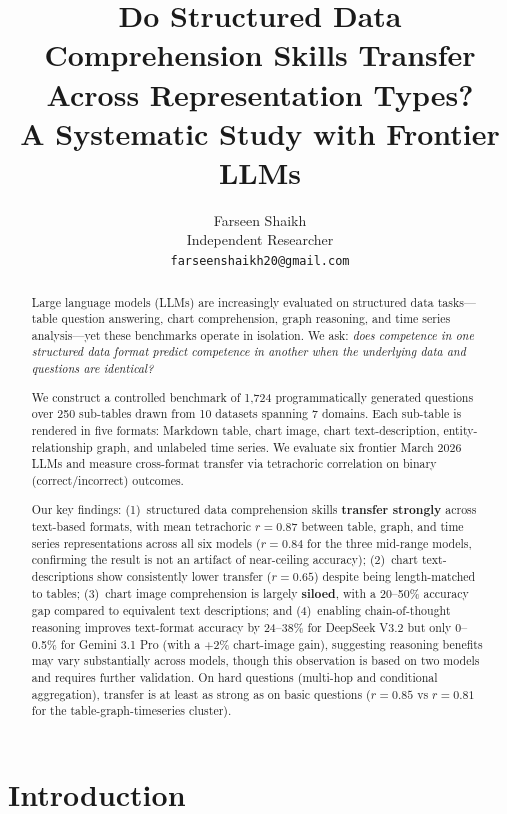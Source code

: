 \documentclass[11pt]{article}
\title{Do Structured Data Comprehension Skills Transfer Across Representation Types?\\A Systematic Study with Frontier LLMs}
\author{Farseen Shaikh \\
  Independent Researcher \\
  \texttt{farseenshaikh20@gmail.com}}
\begin{document}
\maketitle

\begin{abstract}
Large language models (LLMs) are increasingly evaluated on structured data tasks---table question answering, chart comprehension, graph reasoning, and time series analysis---yet these benchmarks operate in isolation. We ask: \emph{does competence in one structured data format predict competence in another when the underlying data and questions are identical?}

We construct a controlled benchmark of 1,724 programmatically generated questions over 250 sub-tables drawn from 10 datasets spanning 7 domains. Each sub-table is rendered in five formats: Markdown table, chart image, chart text-description, entity-relationship graph, and unlabeled time series. We evaluate six frontier March 2026 LLMs and measure cross-format transfer via tetrachoric correlation on binary (correct/incorrect) outcomes.

Our key findings: (1)~structured data comprehension skills \textbf{transfer strongly} across text-based formats, with mean tetrachoric $r{=}0.87$ between table, graph, and time series representations across all six models ($r{=}0.84$ for the three mid-range models, confirming the result is not an artifact of near-ceiling accuracy); (2)~chart text-descriptions show consistently lower transfer ($r{=}0.65$) despite being length-matched to tables; (3)~chart image comprehension is largely \textbf{siloed}, with a 20--50\% accuracy gap compared to equivalent text descriptions; and (4)~enabling chain-of-thought reasoning improves text-format accuracy by 24--38\% for DeepSeek V3.2 but only 0--0.5\% for Gemini 3.1 Pro (with a $+2$\% chart-image gain), suggesting reasoning benefits may vary substantially across models, though this observation is based on two models and requires further validation. On hard questions (multi-hop and conditional aggregation), transfer is at least as strong as on basic questions ($r{=}0.85$ vs $r{=}0.81$ for the table-graph-timeseries cluster).
\end{abstract}

\section{Introduction}
\end{document}
